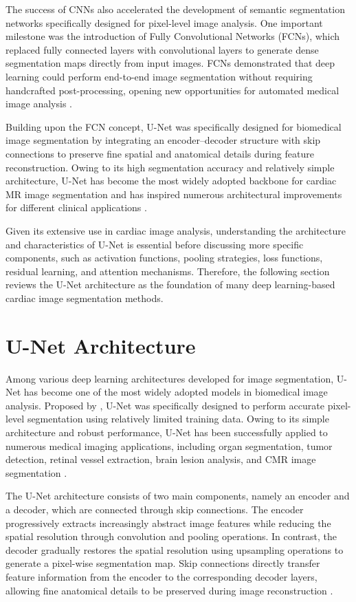 The success of CNNs also accelerated the development of semantic segmentation networks specifically designed for pixel-level image analysis. One important milestone was the introduction of Fully Convolutional Networks (FCNs), which replaced fully connected layers with convolutional layers to generate dense segmentation maps directly from input images. FCNs demonstrated that deep learning could perform end-to-end image segmentation without requiring handcrafted post-processing, opening new opportunities for automated medical image analysis \citep{Long2015}.

Building upon the FCN concept, U-Net was specifically designed for biomedical image segmentation by integrating an encoder--decoder structure with skip connections to preserve fine spatial and anatomical details during feature reconstruction. Owing to its high segmentation accuracy and relatively simple architecture, U-Net has become the most widely adopted backbone for cardiac MR image segmentation and has inspired numerous architectural improvements for different clinical applications \citep{Ronneberger2015,Siddique2021}.

Given its extensive use in cardiac image analysis, understanding the architecture and characteristics of U-Net is essential before discussing more specific components, such as activation functions, pooling strategies, loss functions, residual learning, and attention mechanisms. Therefore, the following section reviews the U-Net architecture as the foundation of many deep learning-based cardiac image segmentation methods.

\section{U-Net Architecture}
\label{sec:unet}

Among various deep learning architectures developed for image segmentation, U-Net has become one of the most widely adopted models in biomedical image analysis. Proposed by \citep{Ronneberger2015}, U-Net was specifically designed to perform accurate pixel-level segmentation using relatively limited training data. Owing to its simple architecture and robust performance, U-Net has been successfully applied to numerous medical imaging applications, including organ segmentation, tumor detection, retinal vessel extraction, brain lesion analysis, and CMR image segmentation \citep{Ronneberger2015,Siddique2021}.

The U-Net architecture consists of two main components, namely an encoder and a decoder, which are connected through skip connections. The encoder progressively extracts increasingly abstract image features while reducing the spatial resolution through convolution and pooling operations. In contrast, the decoder gradually restores the spatial resolution using upsampling operations to generate a pixel-wise segmentation map. Skip connections directly transfer feature information from the encoder to the corresponding decoder layers, allowing fine anatomical details to be preserved during image reconstruction \citep{Ronneberger2015}.

